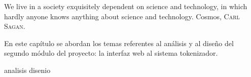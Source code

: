 %
%

{
  \epigrafe
  {%
    We live in a society exquisitely dependent on science and technology, in
    which hardly anyone knows anything about science and technology.%
  }
  {%
    Cosmos,
    \textsc{Carl Sagan}.%
  }
}

\noindent
En este capítulo se abordan los temas referentes al análisis y al diseño del
segundo módulo del proyecto: la interfaz web al sistema tokenizador.

{analisis}
{disenio}

